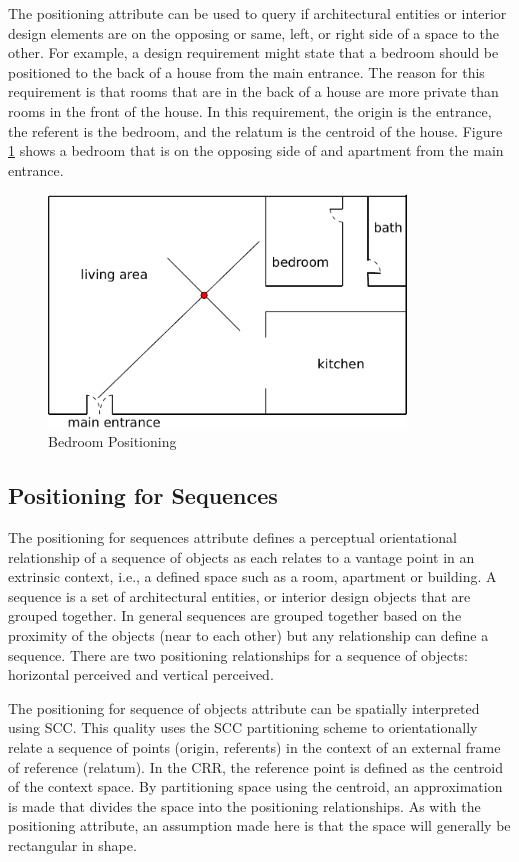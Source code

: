 \documentclass[12pt]{ucthesis}
\begin{document}
The positioning attribute can be used to query if architectural entities or interior design elements are on the opposing or same, left, or right side of a space to the other. For example, a design requirement might state that a bedroom should be positioned to the back of a house from the main entrance. The reason for this requirement is that rooms that are in the back of a house are more private than rooms in the front of the house. In this requirement, the origin is the entrance, the referent is the bedroom, and the relatum is the centroid of the house. Figure \ref{bedroom-positioning} shows a bedroom that is on the opposing side of and apartment from the main entrance. 
\begin{figure}[H]
 \centering
 \includegraphics[width=95mm]{bedroom-back-house}
 \caption{Bedroom Positioning}
\label{bedroom-positioning}
\end{figure}



\subsection{Positioning for Sequences}
The positioning for sequences attribute defines a perceptual orientational relationship of a sequence of objects as each relates to a vantage point in an extrinsic context, i.e., a defined space such as a room, apartment or building. A sequence is a set of architectural entities, or interior design objects that are grouped together. In general sequences are grouped together based on the proximity of the objects (near to each other) but any relationship can define a sequence. There are two positioning relationships for a sequence of objects: horizontal perceived and vertical perceived.  

The positioning for sequence of objects attribute can be spatially interpreted using SCC. This quality uses the SCC partitioning scheme to orientationally relate a sequence of points (origin, referents) in the context of an external frame of reference (relatum). In the CRR, the reference point is defined as the centroid of the context space. By partitioning space using the centroid, an approximation is made that divides the space into the positioning relationships. As with the positioning attribute, an assumption made here is that the space will generally be rectangular in shape.
\end{document}

